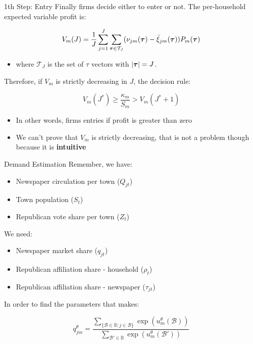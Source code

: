 \documentclass{beamer}
\begin{document}
\begin{frame}[t]{1th Step: Entry}
  Finally firms decide either to enter or not. The per-household
  expected variable profit is:

  \[ V_m(J) = \frac{1}{J} \sum^J_{j = 1} \sum_{\text{\boldmath$\tau$} \in
      \mathcal{T}_J} ( \nu_{jm}(\text{\boldmath$\tau$}) - \bar\xi_{jm}
      (\text{\boldmath$\tau$})) P_m(\text{\boldmath$\tau$}) \]

    \begin{itemize}
      \item where $\mathcal{T}_J$ is the set of \boldmath$\tau$ vectors with
        $|\text{\boldmath$\tau$}| = J$.
    \end{itemize}
    Therefore, if $V_m$ is strictly decreasing in $J$, the decision rule:

    \[ V_m(J^*) \ge \frac{\kappa_m}{S_m} > V_m(J^* + 1) \]

    \begin{itemize}
      \item In other words, firms entries if profit is greater than zero
      \item We can't prove that $V_m$ is strictly decreasing, that is not
        a problem though because it is \textbf{intuitive}
    \end{itemize}
\end{frame}

\begin{frame}[t]{Demand Estimation}
  Remember, we have:
  \begin{itemize}
    \item Newspaper circulation per town ($Q_{jt}$)
    \item Town population ($S_t$)
    \item Republican vote share per town ($Z_t$)
  \end{itemize}

  We need:
  \begin{itemize}
    \item Newspaper market share ($q_{jt}$)
    \item Republican affiliation share - household ($\rho_t$)
    \item Republican affiliation share - newspaper ($\tau_{jt}$)
  \end{itemize}

  In order to find the parameters that makes:

  \[ q^\theta_{jm} =
    \frac{\sum\limits_{\{\mathcal{B} \in \mathbb{B} : j \in \mathcal{B}\}}
        \exp(u^\theta_m(\mathcal{B}))}
      {\sum\limits_{\mathcal{B}' \in \mathbb{B}} \exp(u^\theta_m(\mathcal{B}'))}
    \]
\end{frame}
\end{document}
